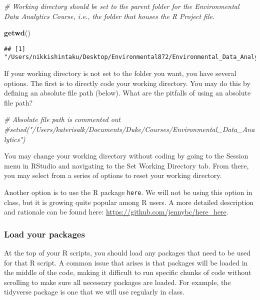 \documentclass[]{article}
\newenvironment{Shaded}{\begin{snugshade}}{\end{snugshade}}
\newcommand{\CommentTok}[1]{\textcolor[rgb]{0.56,0.35,0.01}{\textit{#1}}}
\newcommand{\KeywordTok}[1]{\textcolor[rgb]{0.13,0.29,0.53}{\textbf{#1}}}
\newcommand{\NormalTok}[1]{#1}
\begin{document}
\begin{Shaded}
\begin{Highlighting}[]
\CommentTok{# Working directory should be set to the parent folder for the Environmental Data Analytics Course, i.e., the folder that houses the R Project file.}

\KeywordTok{getwd}\NormalTok{()}
\end{Highlighting}
\end{Shaded}

\begin{verbatim}
## [1] "/Users/nikkishintaku/Desktop/Environmental872/Environmental_Data_Analytics_2020"
\end{verbatim}

If your working directory is not set to the folder you want, you have
several options. The first is to directly code your working directory.
You may do this by defining an absolute file path (below). What are the
pitfalls of using an absolute file path?

\begin{Shaded}
\begin{Highlighting}[]
\CommentTok{# Absolute file path is commented out}
\CommentTok{#setwd("/Users/katerisalk/Documents/Duke/Courses/Environmental_Data_Analytics")}
\end{Highlighting}
\end{Shaded}

You may change your working directory without coding by going to the
Session menu in RStudio and navigating to the Set Working Directory tab.
From there, you may select from a series of options to reset your
working directory.

Another option is to use the R package \texttt{here}. We will not be
using this option in class, but it is growing quite popular among R
users. A more detailed description and rationale can be found here:
\url{https://github.com/jennybc/here_here}.

\hypertarget{load-your-packages}{%
\subsubsection{Load your packages}\label{load-your-packages}}

At the top of your R scripts, you should load any packages that need to
be used for that R script. A common issue that arises is that packages
will be loaded in the middle of the code, making it difficult to run
specific chunks of code without scrolling to make sure all necessary
packages are loaded. For example, the tidyverse package is one that we
will use regularly in class.
\end{document}
